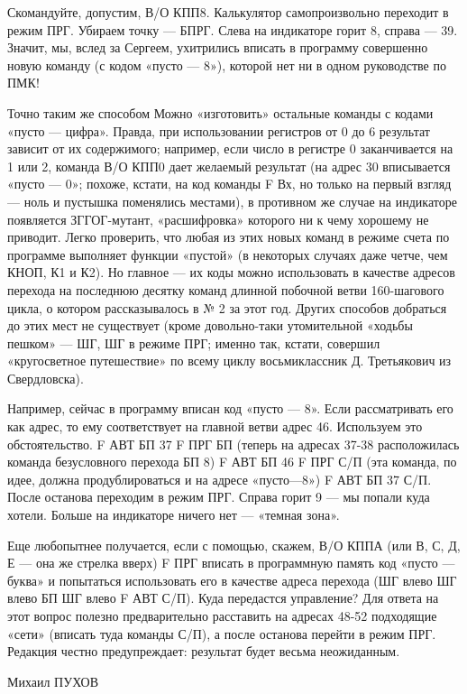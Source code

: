 \documentclass[11pt,a4paper,oneside]{article}
\begin{document}
Скомандуйте, допустим, В/О КПП8. Калькулятор самопроизвольно переходит в режим ПРГ. Убираем точку — БПРГ. Слева на индикаторе горит 8, справа — 39. Значит, мы, вслед за Сергеем, ухитрились вписать в программу совершенно новую команду (с кодом «пусто — 8»), которой нет ни в одном руководстве по ПМК!

Точно таким же способом Можно «изготовить» остальные команды с кодами «пусто — цифра». Правда, при использовании регистров от 0 до 6 результат зависит от их содержимого; например, если число в регистре 0 заканчивается на 1 или 2, команда В/О КПП0 дает желаемый результат (на адрес 30 вписывается «пусто — 0»; похоже, кстати, на код команды F Вх, но только на первый взгляд — ноль и пустышка поменялись местами), в противном же случае на индикаторе появляется ЗГГОГ-мутант, «расшифровка» которого ни к чему хорошему не приводит. Легко проверить, что любая из этих новых команд в режиме счета по программе выполняет функции «пустой» (в некоторых случаях даже четче, чем КНОП, К1 и К2). Но главное — их коды можно использовать в качестве адресов перехода на последнюю десятку команд длинной побочной ветви 160-шагового цикла, о котором рассказывалось в № 2 за этот год. Других способов добраться до этих мест не существует (кроме довольно-таки утомительной «ходьбы пешком» — ШГ, ШГ в режиме ПРГ; именно так, кстати, совершил «кругосветное путешествие» по всему циклу восьмиклассник Д. Третьякович из Свердловска).

Например, сейчас в программу вписан код «пусто — 8». Если рассматривать его как адрес, то ему соответствует на главной ветви адрес 46. Используем это обстоятельство. F АВТ БП 37 F ПРГ БП (теперь на адресах 37-38 расположилась команда безусловного перехода БП 8) F АВТ БП 46 F ПРГ С/П (эта команда, по идее, должна продублироваться и на адресе «пусто—8») F АВТ БП 37 С/П. После останова переходим в режим ПРГ. Справа горит 9 — мы попали куда хотели. Больше на индикаторе ничего нет — «темная зона».

Еще любопытнее получается, если с помощью, скажем, В/О КППА (или В, С, Д, Е — она же стрелка вверх) F ПРГ вписать в программную память код «пусто — буква» и попытаться использовать его в качестве адреса перехода (ШГ влево ШГ влево БП ШГ влево F АВТ С/П). Куда передастся управление? Для ответа на этот вопрос полезно предварительно расставить на адресах 48-52 подходящие «сети» (вписать туда команды С/П), а после останова перейти в режим ПРГ. Редакция честно предупреждает: результат будет весьма неожиданным.

Михаил ПУХОВ
\end{document}
